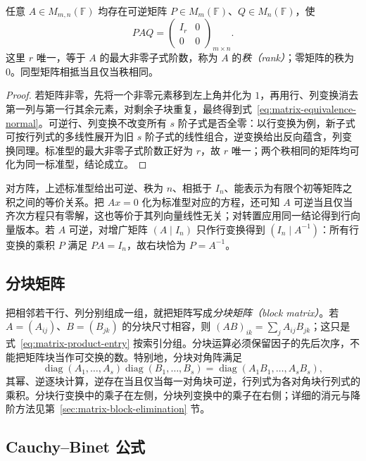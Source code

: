\begin{theorem}
\label{thm:matrix-equivalence-normal}
任意 $A\in M_{m,n}(\mathbb F)$ 均存在可逆矩阵 $P\in M_m(\mathbb F)$、$Q\in M_n(\mathbb F)$，使
\begin{equation}
 PAQ=\begin{pmatrix}I_r&0\\0&0\end{pmatrix}_{m\times n}.
 \label{eq:matrix-equivalence-normal}
\end{equation}
这里 $r$ 唯一，等于 $A$ 的最大非零子式阶数，称为 $A$ 的\emph{秩（rank）}；零矩阵的秩为 $0$。同型矩阵相抵当且仅当秩相同。
\end{theorem}
\begin{proof}
若矩阵非零，先将一个非零元素移到左上角并化为 $1$，再用行、列变换消去第一列与第一行其余元素，对剩余子块重复，最终得到式~\eqref{eq:matrix-equivalence-normal}。可逆行、列变换不改变所有 $s$ 阶子式是否全零：以行变换为例，新子式可按行列式的多线性展开为旧 $s$ 阶子式的线性组合，逆变换给出反向蕴含，列变换同理。标准型的最大非零子式阶数正好为 $r$，故 $r$ 唯一；两个秩相同的矩阵均可化为同一标准型，结论成立。
\end{proof}

对方阵，上述标准型给出可逆、秩为 $n$、相抵于 $I_n$、能表示为有限个初等矩阵之积之间的等价关系。把 $Ax=0$ 化为标准型对应的方程，还可知 $A$ 可逆当且仅当齐次方程只有零解，这也等价于其列向量线性无关；对转置应用同一结论得到行向量版本。若 $A$ 可逆，对增广矩阵 $(A\mid I_n)$ 只作行变换得到 $(I_n\mid A^{-1})$：所有行变换的乘积 $P$ 满足 $PA=I_n$，故右块恰为 $P=A^{-1}$。

\subsection{分块矩阵}

把相邻若干行、列分别组成一组，就把矩阵写成\emph{分块矩阵（block matrix）}。若 $A=(A_{ij})$、$B=(B_{jk})$ 的分块尺寸相容，则 $(AB)_{ik}=\sum_jA_{ij}B_{jk}$；这只是式~\eqref{eq:matrix-product-entry} 按索引分组。分块运算必须保留因子的先后次序，不能把矩阵块当作可交换的数。特别地，分块对角阵满足
\[
 \operatorname{diag}(A_1,\ldots,A_s)\operatorname{diag}(B_1,\ldots,B_s)
 =\operatorname{diag}(A_1B_1,\ldots,A_sB_s),
\]
其幂、逆逐块计算，逆存在当且仅当每一对角块可逆，行列式为各对角块行列式的乘积。分块行变换中的乘子在左侧，分块列变换中的乘子在右侧；详细的消元与降阶方法见第~\ref{sec:matrix-block-elimination} 节。

\subsection{Cauchy--Binet 公式}

